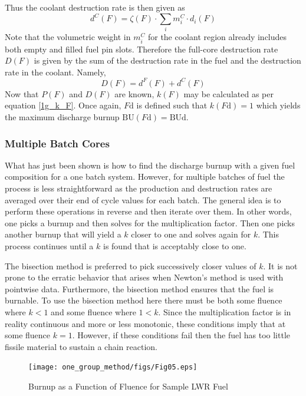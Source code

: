 Thus the coolant destruction rate is then given as
\begin{equation}
\label{1g_dC_F}
d^C(F) = \zeta(F) \cdot \sum_i m_i^C \cdot d_i(F)
\end{equation}
Note that the volumetric weight in $m_i^C$ for the coolant region already includes both 
empty and filled fuel pin slots.  Therefore the full-core destruction rate $D(F)$ is given by 
the sum of the destruction rate in the fuel and the destruction rate in the coolant.  Namely, 
\begin{equation}
\label{1g_D_F}
D(F) = d^F(F) + d^C(F)
\end{equation}
Now that $P(F)$ and $D(F)$ are known, $k(F)$ may be calculated as per equation \ref{1g_k_F}.  
Once again, $F\mbox{d}$ is defined such that $k(F\mbox{d}) = 1$ which yields the maximum discharge 
burnup $\mbox{BU}(F\mbox{d}) = \mbox{BUd}$.




\subsubsection{Multiple Batch Cores}
\label{1g_sec:batch_ave}
What has just been shown is how to find the discharge burnup with a given fuel composition for a one
batch system.  However, for multiple batches of fuel the process is less straightforward as the 
production and destruction rates are averaged over their end of cycle values for each batch.  
The general idea is to perform these operations in reverse and then iterate over them.  
In other words, one picks a burnup and then solves for the multiplication factor.  Then one picks 
another burnup that will yield a $k$ closer to one and solves again for $k$.  This process continues 
until a $k$ is found that is acceptably close to one.  

The bisection method is preferred to pick successively closer values of $k$.  It is not prone to the 
erratic behavior that arises when Newton's method is used with pointwise data.   Furthermore, the 
bisection method ensures that the fuel is burnable.  To use the bisection method here there must 
be both some fluence where $k < 1$ and some fluence where $1 < k$.  Since the multiplication factor 
is in reality continuous and more or less monotonic, these conditions imply that at some fluence $k = 1$.  
However, if these conditions fail then the fuel has too little fissile material to sustain a chain reaction. 

\begin{figure}[htbp]
\caption{Burnup as a Function of Fluence for Sample LWR Fuel}
\label{1g_fig05}
\begin{center}
\texttt{[image: one\_group\_method/figs/Fig05.eps]}
\end{center}
\end{figure}

